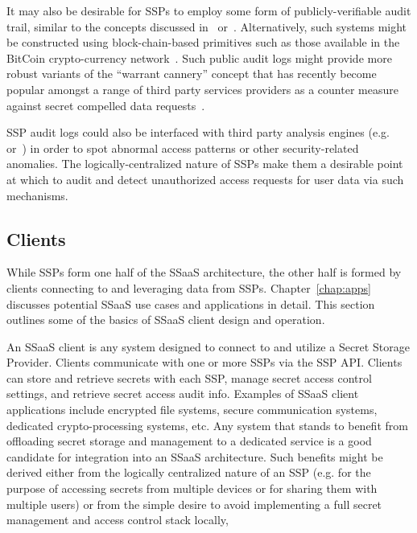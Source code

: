 It may also be desirable for SSPs to employ some form of
publicly-verifiable audit trail, similar to the concepts discussed
in~\cite{blaze1996} or~\cite{laurie2013}. Alternatively, such systems
might be constructed using block-chain-based primitives such as those
available in the BitCoin crypto-currency
network~\cite{Nakamoto2008}. Such public audit logs might provide more
robust variants of the ``warrant cannery'' concept that has recently
become popular amongst a range of third party services providers as a
counter measure against secret compelled data
requests~\cite{eff-canary}.

SSP audit logs could also be interfaced with third party analysis
engines (e.g.~\cite{logrythm} or~\cite{splunk}) in order to spot
abnormal access patterns or other security-related anomalies. The
logically-centralized nature of SSPs make them a desirable point at
which to audit and detect unauthorized access requests for user data
via such mechanisms.

\subsection{Clients}

While SSPs form one half of the SSaaS architecture, the other half is
formed by clients connecting to and leveraging data from
SSPs. Chapter~\ref{chap:apps} discusses potential SSaaS use cases and
applications in detail. This section outlines some of the basics of
SSaaS client design and operation.

An SSaaS client is any system designed to connect to and utilize a
Secret Storage Provider. Clients communicate with one or more SSPs via
the SSP API. Clients can store and retrieve secrets with each SSP,
manage secret access control settings, and retrieve secret access
audit info. Examples of SSaaS client applications include encrypted
file systems, secure communication systems, dedicated
crypto-processing systems, etc. Any system that stands to benefit from
offloading secret storage and management to a dedicated service is a
good candidate for integration into an SSaaS architecture. Such
benefits might be derived either from the logically centralized nature
of an SSP (e.g. for the purpose of accessing secrets from multiple
devices or for sharing them with multiple users) or from the simple
desire to avoid implementing a full secret management and access
control stack locally,


